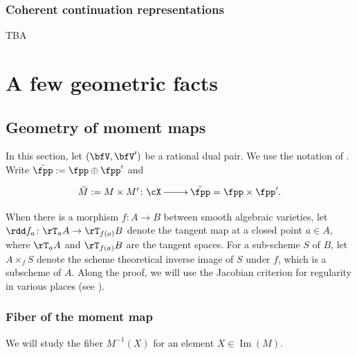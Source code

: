 \documentclass[12pt,a4paper]{amsart}
\newcommand{\trivial}[2][]{\if\relax\detokenize{#1}\relax
  {%
      \color{orange} \vspace{0em} $[$  #2 $]$
      \color{black}
  }
  \else
\ifx#1h
\ifcsname showtrivial\endcsname
{%
    \color{orange} \vspace{0em}  $[$ #2 $]$
    \color{black}
}
\fi
\else {\red Wrong argument!} \fi
\fi
}
\def\Im{\operatorname{Im}}
\numberwithin{equation}{section}
\theoremstyle{remark}
\begin{document}
\subsubsection{Coherent continuation representations}

{\color{red} TBA}


\section{A few geometric facts}
\def\dbM{\breve{M}}
\def\dbMM{\breve{MM}}
\def\dbX{\breve{X}}
\def\dbfpp{\breve{\fpp}}
\def\ZdbX{\cZ_{\dbX}}
\def\aV{\acute{V}}

\subsection{Geometry of moment maps}\label{sec:GM}
In this section, let $(\bfV,\bfV')$ be a rational dual
pair.%
We use the notation of .
Write
 $\dbfpp := \fpp\oplus \fpp'$ and
\[
\xymatrix{
\dbM := M\times M' \colon \cX \ar[r]& \dbfpp
= \fpp\times \fpp'.
}
\]




When there is a morphism $f\colon A\rightarrow B$ between smooth
algebraic varieties, let $\rdd f_a\colon \rT_aA
\rightarrow \rT_{f(a)}B$ denote the tangent map at a closed point $a\in A$, where
$\rT_aA$ and $\rT_{f(a)} B$ are the tangent spaces. For a
sub-scheme $S$ of $B$, let $A\times_fS$ denote the scheme
theoretical inverse image of $S$ under $f$, which is a subscheme of $A$.
Along the proof, we will use the Jacobian criterion for
regularity in various places (see \cite[Theorem~2.19]{LiuAG}).


\subsubsection{Fiber of the moment map}\label{sec:F.M}

We will study the fiber $M^{-1}(X)$ for an element $X\in \Im(M)$. %
\end{document}
